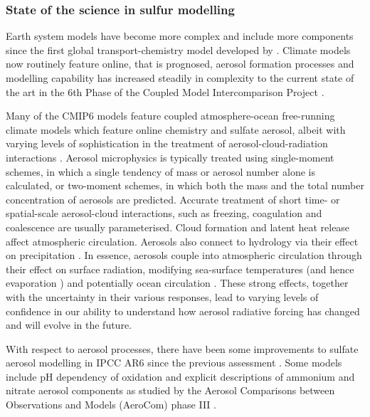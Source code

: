 \subsubsection{State of the science in sulfur modelling}

Earth system models have become more complex and include more components since the first global transport-chemistry model developed by \citet{langnerGlobalThreedimensionalModel1991}. Climate models now routinely feature online, that is prognosed, aerosol formation processes and modelling capability has increased steadily in complexity to the current state of the art in the 6th Phase of the Coupled Model Intercomparison Project \citep[CMIP6, details in next section;][]{eyringOverviewCoupledModel2016}. 

Many of the CMIP6 models feature coupled atmosphere-ocean free-running climate models which feature online chemistry and sulfate aerosol, albeit with varying levels of sophistication in the treatment of aerosol-cloud-radiation interactions \citep[e.g.][]{zhangBCCESM1ModelDatasets2021, vannoijeECEarth3AerChemGlobalClimate2021, mulcahyDescriptionEvaluationAerosol2020}.  Aerosol microphysics is typically treated using single-moment schemes, in which a single tendency of mass or aerosol number alone is calculated, or two-moment schemes, in which both the mass and the total number concentration of aerosols are predicted.  Accurate treatment of short time- or spatial-scale aerosol-cloud interactions, such as freezing, coagulation and coalescence are usually parameterised. Cloud formation and latent heat release affect atmospheric circulation.  Aerosols also connect to hydrology via their effect on precipitation \citep{allenInterhemisphericAerosolRadiative2015}. In essence, aerosols couple into atmospheric circulation through their effect on surface radiation, modifying sea-surface temperatures (and hence evaporation \citep{boothAerosolsImplicatedPrime2012}) and potentially ocean circulation \citep{cowanResponseLargescaleOcean2013}. These strong effects, together with the uncertainty in their various responses, lead to varying levels of confidence in our ability to understand how aerosol radiative forcing has changed and will evolve in the future.


With respect to aerosol processes, there have been some improvements to sulfate aerosol modelling in IPCC AR6 since the previous assessment \citep{forsterEarthEnergyBudget2021}. Some models include pH dependency of  oxidation \citep[such as the NorESM1;][]{kirkevagProductiontaggedAerosolModule2018} and explicit descriptions of ammonium and nitrate aerosol components as studied by the Aerosol Comparisons between Observations and Models (AeroCom) phase III \citep{bianInvestigationGlobalParticulate2017}.


